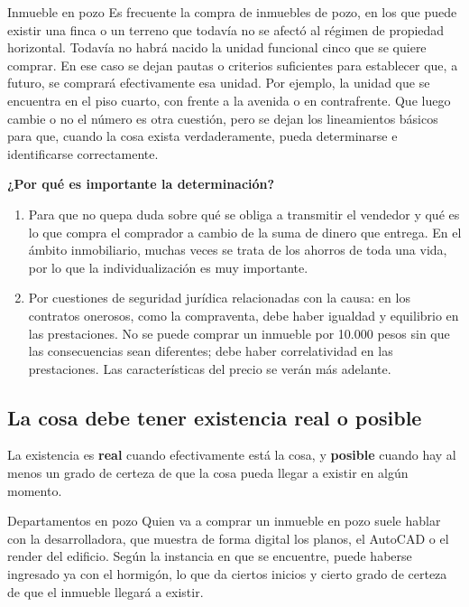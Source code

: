\documentclass[12pt,oneside]{book}
\begin{document}
\begin{example}{Inmueble en pozo}
Es frecuente la compra de inmuebles de pozo, en los que puede existir una finca o un terreno que todavía no se afectó al régimen de propiedad horizontal. Todavía no habrá nacido la unidad funcional cinco que se quiere comprar. En ese caso se dejan pautas o criterios suficientes para establecer que, a futuro, se comprará efectivamente esa unidad. Por ejemplo, la unidad que se encuentra en el piso cuarto, con frente a la avenida o en contrafrente. Que luego cambie o no el número es otra cuestión, pero se dejan los lineamientos básicos para que, cuando la cosa exista verdaderamente, pueda determinarse e identificarse correctamente.
\end{example}

\textbf{¿Por qué es importante la determinación?}
\begin{enumerate}
\item Para que no quepa duda sobre qué se obliga a transmitir el vendedor y qué es lo que compra el comprador a cambio de la suma de dinero que entrega. En el ámbito inmobiliario, muchas veces se trata de los ahorros de toda una vida, por lo que la individualización es muy importante.
\item Por cuestiones de seguridad jurídica relacionadas con la causa: en los contratos onerosos, como la compraventa, debe haber igualdad y equilibrio en las prestaciones. No se puede comprar un inmueble por 10.000 pesos sin que las consecuencias sean diferentes; debe haber correlatividad en las prestaciones. Las características del precio se verán más adelante.
\end{enumerate}

\subsection{La cosa debe tener existencia real o posible}

La existencia es \textbf{real} cuando efectivamente está la cosa, y \textbf{posible} cuando hay al menos un grado de certeza de que la cosa pueda llegar a existir en algún momento.

\begin{example}{Departamentos en pozo}
Quien va a comprar un inmueble en pozo suele hablar con la desarrolladora, que muestra de forma digital los planos, el AutoCAD o el render del edificio. Según la instancia en que se encuentre, puede haberse ingresado ya con el hormigón, lo que da ciertos inicios y cierto grado de certeza de que el inmueble llegará a existir.
\end{example}
\end{document}
